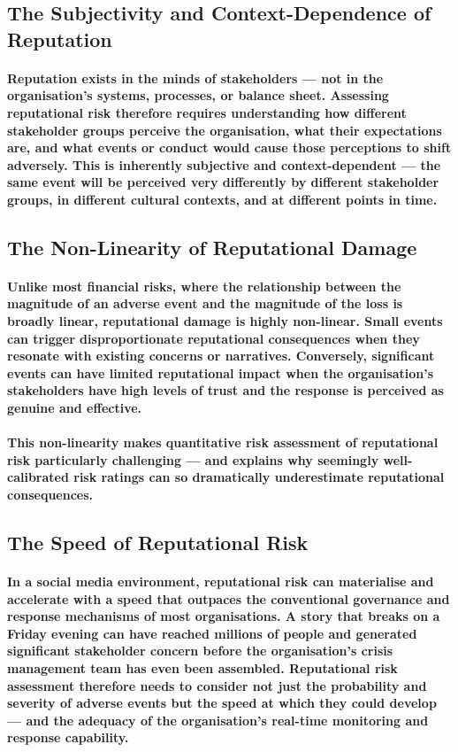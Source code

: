 \subsection{The Subjectivity and Context-Dependence of Reputation}
\paragraph{Reputation exists in the minds of stakeholders — not in the organisation's systems, processes, or balance sheet. Assessing reputational risk therefore requires understanding how different stakeholder groups perceive the organisation, what their expectations are, and what events or conduct would cause those perceptions to shift adversely. This is inherently subjective and context-dependent — the same event will be perceived very differently by different stakeholder groups, in different cultural contexts, and at different points in time.}

\subsection{The Non-Linearity of Reputational Damage}
\paragraph{Unlike most financial risks, where the relationship between the magnitude of an adverse event and the magnitude of the loss is broadly linear, reputational damage is highly non-linear. Small events can trigger disproportionate reputational consequences when they resonate with existing concerns or narratives. Conversely, significant events can have limited reputational impact when the organisation's stakeholders have high levels of trust and the response is perceived as genuine and effective.}
\paragraph{This non-linearity makes quantitative risk assessment of reputational risk particularly challenging — and explains why seemingly well-calibrated risk ratings can so dramatically underestimate reputational consequences.}

\subsection{The Speed of Reputational Risk}
\paragraph{In a social media environment, reputational risk can materialise and accelerate with a speed that outpaces the conventional governance and response mechanisms of most organisations. A story that breaks on a Friday evening can have reached millions of people and generated significant stakeholder concern before the organisation's crisis management team has even been assembled. Reputational risk assessment therefore needs to consider not just the probability and severity of adverse events but the speed at which they could develop — and the adequacy of the organisation's real-time monitoring and response capability.}

